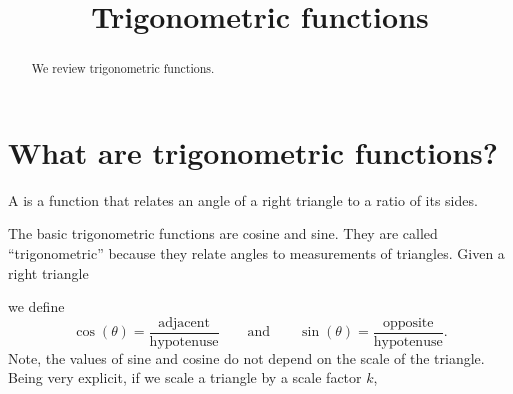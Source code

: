 \documentclass{ximera}
\title[Dig-In:]{Trigonometric functions}
\begin{document}
\begin{abstract}
  We review trigonometric functions.
\end{abstract}
\maketitle



\section{What are trigonometric functions?}

\begin{definition}
  A  is a function that relates an angle
  of a right triangle to a ratio of its sides.
\end{definition}


The basic trigonometric functions are cosine and sine. They are called
``trigonometric'' because they relate angles to measurements of
triangles. Given a right triangle
\begin{image}
\end{image}
we define
\[
\cos(\theta) =
\frac{\text{adjacent}}{\text{hypotenuse}}\qquad\text{and}\qquad\sin(\theta)
= \frac{\text{opposite}}{\text{hypotenuse}}.
\]
Note, the values of sine and cosine do not depend on the scale of the
triangle. Being very explicit, if we scale a triangle by a scale
factor $k$,
\end{document}
